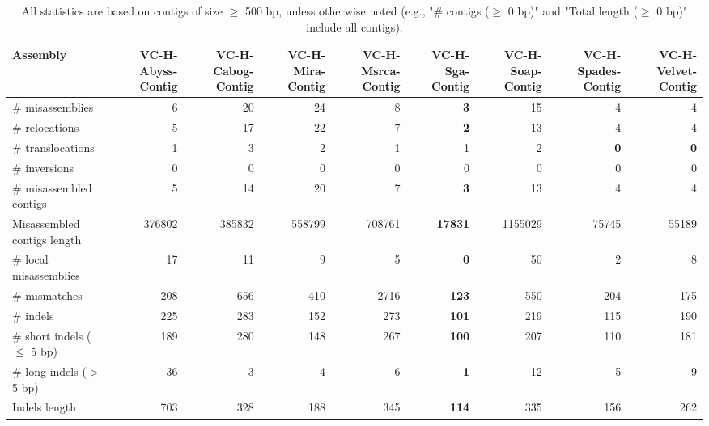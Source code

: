 \documentclass[12pt,a4paper]{article}
\begin{document}
\begin{table}[ht]
\begin{center}
\caption{All statistics are based on contigs of size $\geq$ 500 bp, unless otherwise noted (e.g., "\# contigs ($\geq$ 0 bp)" and "Total length ($\geq$ 0 bp)" include all contigs).}
\begin{tabular}{|l*{8}{|r}|}
\hline
Assembly & VC-H-Abyss-Contig & VC-H-Cabog-Contig & VC-H-Mira-Contig & VC-H-Msrca-Contig & VC-H-Sga-Contig & VC-H-Soap-Contig & VC-H-Spades-Contig & VC-H-Velvet-Contig \\ \hline
\# misassemblies & 6 & 20 & 24 & 8 & {\bf 3} & 15 & 4 & 4 \\ \hline
\hspace{5mm}\# relocations & 5 & 17 & 22 & 7 & {\bf 2} & 13 & 4 & 4 \\ \hline
\hspace{5mm}\# translocations & 1 & 3 & 2 & 1 & 1 & 2 & {\bf 0} & {\bf 0} \\ \hline
\hspace{5mm}\# inversions & 0 & 0 & 0 & 0 & 0 & 0 & 0 & 0 \\ \hline
\# misassembled contigs & 5 & 14 & 20 & 7 & {\bf 3} & 13 & 4 & 4 \\ \hline
Misassembled contigs length & 376802 & 385832 & 558799 & 708761 & {\bf 17831} & 1155029 & 75745 & 55189 \\ \hline
\# local misassemblies & 17 & 11 & 9 & 5 & {\bf 0} & 50 & 2 & 8 \\ \hline
\# mismatches & 208 & 656 & 410 & 2716 & {\bf 123} & 550 & 204 & 175 \\ \hline
\# indels & 225 & 283 & 152 & 273 & {\bf 101} & 219 & 115 & 190 \\ \hline
\hspace{5mm}\# short indels ($\leq$ 5 bp) & 189 & 280 & 148 & 267 & {\bf 100} & 207 & 110 & 181 \\ \hline
\hspace{5mm}\# long indels ($>$ 5 bp) & 36 & 3 & 4 & 6 & {\bf 1} & 12 & 5 & 9 \\ \hline
Indels length & 703 & 328 & 188 & 345 & {\bf 114} & 335 & 156 & 262 \\ \hline
\end{tabular}
\end{center}
\end{table}
\end{document}
